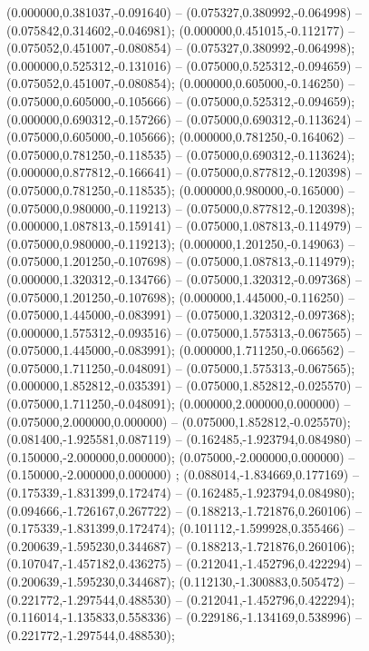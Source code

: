 (0.000000,0.381037,-0.091640) -- (0.075327,0.380992,-0.064998) -- (0.075842,0.314602,-0.046981);
 (0.000000,0.451015,-0.112177) -- (0.075052,0.451007,-0.080854) -- (0.075327,0.380992,-0.064998);
 (0.000000,0.525312,-0.131016) -- (0.075000,0.525312,-0.094659) -- (0.075052,0.451007,-0.080854);
 (0.000000,0.605000,-0.146250) -- (0.075000,0.605000,-0.105666) -- (0.075000,0.525312,-0.094659);
 (0.000000,0.690312,-0.157266) -- (0.075000,0.690312,-0.113624) -- (0.075000,0.605000,-0.105666);
 (0.000000,0.781250,-0.164062) -- (0.075000,0.781250,-0.118535) -- (0.075000,0.690312,-0.113624);
 (0.000000,0.877812,-0.166641) -- (0.075000,0.877812,-0.120398) -- (0.075000,0.781250,-0.118535);
 (0.000000,0.980000,-0.165000) -- (0.075000,0.980000,-0.119213) -- (0.075000,0.877812,-0.120398);
 (0.000000,1.087813,-0.159141) -- (0.075000,1.087813,-0.114979) -- (0.075000,0.980000,-0.119213);
 (0.000000,1.201250,-0.149063) -- (0.075000,1.201250,-0.107698) -- (0.075000,1.087813,-0.114979);
 (0.000000,1.320312,-0.134766) -- (0.075000,1.320312,-0.097368) -- (0.075000,1.201250,-0.107698);
 (0.000000,1.445000,-0.116250) -- (0.075000,1.445000,-0.083991) -- (0.075000,1.320312,-0.097368);
 (0.000000,1.575312,-0.093516) -- (0.075000,1.575313,-0.067565) -- (0.075000,1.445000,-0.083991);
 (0.000000,1.711250,-0.066562) -- (0.075000,1.711250,-0.048091) -- (0.075000,1.575313,-0.067565);
 (0.000000,1.852812,-0.035391) -- (0.075000,1.852812,-0.025570) -- (0.075000,1.711250,-0.048091);
 (0.000000,2.000000,0.000000) -- (0.075000,2.000000,0.000000) -- (0.075000,1.852812,-0.025570);
 (0.081400,-1.925581,0.087119) -- (0.162485,-1.923794,0.084980) -- (0.150000,-2.000000,0.000000);
 (0.075000,-2.000000,0.000000) -- (0.150000,-2.000000,0.000000) ;
 (0.088014,-1.834669,0.177169) -- (0.175339,-1.831399,0.172474) -- (0.162485,-1.923794,0.084980);
 (0.094666,-1.726167,0.267722) -- (0.188213,-1.721876,0.260106) -- (0.175339,-1.831399,0.172474);
 (0.101112,-1.599928,0.355466) -- (0.200639,-1.595230,0.344687) -- (0.188213,-1.721876,0.260106);
 (0.107047,-1.457182,0.436275) -- (0.212041,-1.452796,0.422294) -- (0.200639,-1.595230,0.344687);
 (0.112130,-1.300883,0.505472) -- (0.221772,-1.297544,0.488530) -- (0.212041,-1.452796,0.422294);
 (0.116014,-1.135833,0.558336) -- (0.229186,-1.134169,0.538996) -- (0.221772,-1.297544,0.488530);
